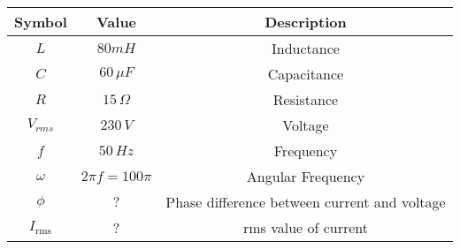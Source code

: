 \begin{tabular}{|c|c|c|}
	\hline
	\textbf{Symbol} & \textbf{Value} &
	\textbf{Description}\\[6pt]
	\hline
	$L$ &  $80mH$ & Inductance\\[6pt]
	\hline 
	$C$ &  $60\, \mu F$ & Capacitance \\[6pt]
	\hline
	$R$ &  $15\, \Omega$ & Resistance\\[6pt]
	\hline
	$V_{rms}$ & $230\, V$ & Voltage\\[6pt]
	\hline
	$f$ & $50\, {Hz}$ & Frequency\\[6pt]
	\hline
	$\omega$ & $2\pi f=100\pi$ & Angular Frequency\\[6pt]
	\hline
	$\phi$ & $?$ & Phase difference between current and voltage\\[6pt]
	\hline
	$I_ \text{rms}$ & ? & rms value of current\\
	\hline
\end{tabular}